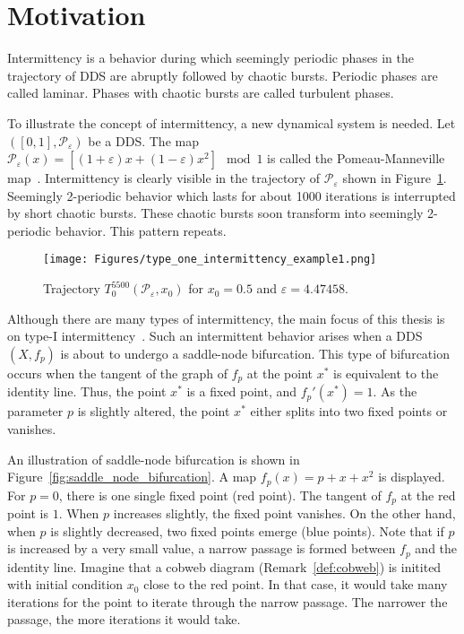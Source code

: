 \section{Motivation}
Intermittency is a behavior during which seemingly periodic phases in the trajectory of DDS are abruptly followed by chaotic bursts.
Periodic phases are called laminar.
Phases with chaotic bursts are called turbulent phases.
\par
To illustrate the concept of intermittency, a new dynamical system is needed.
Let $([0, 1], \mathcal{P}_{\varepsilon})$ be a DDS.
The map $\mathcal{P}_{\varepsilon}(x) = \left[ (1+\varepsilon)x+(1-\varepsilon)x^2 \right] \mod{1}$ is called the Pomeau-Manneville map~\cite{Manneville1980,Datseris2022}.
Intermittency is clearly visible in the trajectory of $\mathcal{P}_{\varepsilon}$ shown in Figure~\ref{fig:intermittent_trajectory_example}.
Seemingly 2-periodic behavior which lasts for about 1000 iterations is interrupted by short chaotic bursts.
These chaotic bursts soon transform into seemingly 2-periodic behavior.
This pattern repeats.

\begin{figure}[!h]
    \centering
    \texttt{[image: Figures/type\_one\_intermittency\_example1.png]}
    \caption{
        Trajectory $T^{5500}_{0}(\mathcal{P}_{\varepsilon}, x_0)$ for $x_0 = 0.5$ and $\varepsilon = 4.47458$.
    }
    \label{fig:intermittent_trajectory_example}
\end{figure}

Although there are many types of intermittency, the main focus of this thesis is on type-I intermittency~\cite{Pomeau1980,Bussac1982,DelRio2014}.
Such an intermittent behavior arises when a DDS $(X, f_{p})$ is about to undergo a saddle-node bifurcation.
This type of bifurcation occurs when the tangent of the graph of $f_{p}$ at the point $x^{*}$ is equivalent to the identity line.
Thus, the point $x^{*}$ is a fixed point, and $f_{p}'(x^{*}) = 1$.
As the parameter $p$ is slightly altered, the point $x^{*}$ either splits into two fixed points or vanishes.
\par
An illustration of saddle-node bifurcation is shown in Figure~\ref{fig:saddle_node_bifurcation}.
A map $f_{p}(x) = p + x + x^2$ is displayed.
For $p = 0$, there is one single fixed point (red point).
The tangent of $f_{p}$ at the red point is $1$.
When $p$ increases slightly, the fixed point vanishes.
On the other hand, when $p$ is slightly decreased, two fixed points emerge (blue points).
Note that if $p$ is increased by a very small value, a narrow passage is formed between $f_{p}$ and the identity line.
Imagine that a cobweb diagram (Remark~\ref{def:cobweb}) is initited with initial condition $x_0$ close to the red point.
In that case, it would take many iterations for the point to iterate through the narrow passage.
The narrower the passage, the more iterations it would take.

